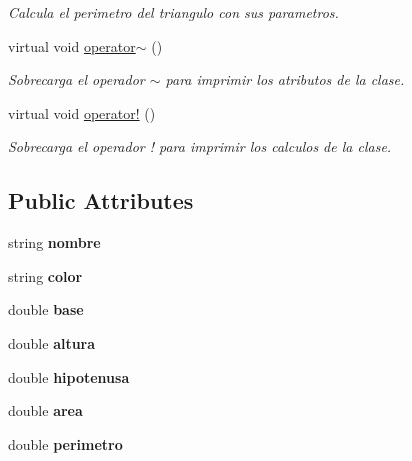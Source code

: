 \begin{DoxyCompactItemize}
\begin{DoxyCompactList}\small\item\em Calcula el perimetro del triangulo con sus parametros. \end{DoxyCompactList}\item 
\hypertarget{class_triangulo_af7fc480161706ec74ece32e9ef1fed7f}{}\label{class_triangulo_af7fc480161706ec74ece32e9ef1fed7f} 
virtual void \hyperlink{class_triangulo_af7fc480161706ec74ece32e9ef1fed7f}{operator$\sim$} ()
\begin{DoxyCompactList}\small\item\em Sobrecarga el operador $\sim$ para imprimir los atributos de la clase. \end{DoxyCompactList}\item 
\hypertarget{class_triangulo_ae0552ffa9641d36e1f571349e5de1070}{}\label{class_triangulo_ae0552ffa9641d36e1f571349e5de1070} 
virtual void \hyperlink{class_triangulo_ae0552ffa9641d36e1f571349e5de1070}{operator!} ()
\begin{DoxyCompactList}\small\item\em Sobrecarga el operador ! para imprimir los calculos de la clase. \end{DoxyCompactList}\end{DoxyCompactItemize}
\subsection*{Public Attributes}
\begin{DoxyCompactItemize}
\item 
\hypertarget{class_triangulo_a92bbfa4ca7bc38489e7bddd797a84cbf}{}\label{class_triangulo_a92bbfa4ca7bc38489e7bddd797a84cbf} 
string {\bfseries nombre}
\item 
\hypertarget{class_triangulo_a437071d8f69923add54c5bedb74cce10}{}\label{class_triangulo_a437071d8f69923add54c5bedb74cce10} 
string {\bfseries color}
\item 
\hypertarget{class_triangulo_a77fe2a9ef9624495cd93f306ee115e54}{}\label{class_triangulo_a77fe2a9ef9624495cd93f306ee115e54} 
double {\bfseries base}
\item 
\hypertarget{class_triangulo_a4a3435a7e19354df87419f17c9ce309f}{}\label{class_triangulo_a4a3435a7e19354df87419f17c9ce309f} 
double {\bfseries altura}
\item 
\hypertarget{class_triangulo_afbe83fdbbfaf050a12c78fd29f1729f3}{}\label{class_triangulo_afbe83fdbbfaf050a12c78fd29f1729f3} 
double {\bfseries hipotenusa}
\item 
\hypertarget{class_triangulo_a7c272d5536b605370cb7ecd8a0c26d08}{}\label{class_triangulo_a7c272d5536b605370cb7ecd8a0c26d08} 
double {\bfseries area}
\item 
\hypertarget{class_triangulo_afb3326a460dc259a32bddb59cdc106a4}{}\label{class_triangulo_afb3326a460dc259a32bddb59cdc106a4} 
double {\bfseries perimetro}
\end{DoxyCompactItemize}


